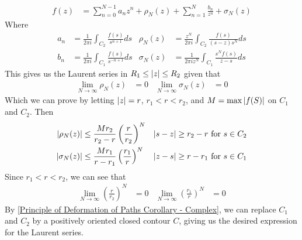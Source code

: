 \documentclass[12pt, english]{book}
\makeatletter
\renewenvironment{proof}[1][\proofname]{\par
	\pushQED{\qed}%
	\normalfont \topsep6\p@\@plus6\p@\relax
	\list{}{%
		\settowidth{\leftmargin}{\itshape\proofname:\hskip\labelsep}%
		\setlength{\labelwidth}{0pt}%
		\setlength{\itemindent}{-\leftmargin}%
		}%
	\item[\hskip\labelsep\itshape#1\@addpunct{:}]\ignorespaces
	}{\popQED\endlist\@endpefalse}
\makeatother
\begin{document}
\begin{proof}
\begin{align*}
 			f(z) &= \sum_{n=0}^{N-1} a_n z^n + \rho_N (z) + \sum_{n=1}^{N} \frac{b_n}{z^n} + \sigma_N (z) 
 		\end{align*}
 		Where
 		\begin{align*}
 			a_n &= \frac{1}{2\pi i} \int_{C_2} \frac{f(s)}{s^{n+1}} ds &
 				\rho_N (z) &= \frac{z^N}{2\pi i} \int_{C_2} \frac{f(s)}{(s-z)s^N} ds \\
 			b_n &= \frac{1}{2\pi i} \int_{C_1} \frac{f(s)}{s^{-n+1}} ds &
 				\sigma_N (z) &= \frac{1}{2\pi i z^N} \int_{C_1} \frac{s^N f(s)}{z-s} ds
 		\end{align*}
 		This gives us the Laurent series in \(R_1 \leq \abs{z} \leq R_2\) given that 
 		\begin{align*}
 			\lim_{N\rightarrow \infty} \rho_N(z) &= 0 & 
 			\lim_{N\rightarrow \infty} \sigma_N (z) &= 0
 		\end{align*}
 		Which we can prove by letting \(\abs{z} = r\), \(r_1 < r < r_2\), and \(M = \max\abs{f(S)}\) on \(C_1\) and \(C_2\). Then
 		\begin{align*}
 			\abs{\rho_N (z)} &\leq \frac{M r_2}{r_2 - r} \left(\frac{r}{r_2}\right)^N & 
 				\abs{s-z} &\geq r_2 - r  \text{ for } s \in C_2\\
 			\abs{\sigma_N (z)} &\leq \frac{M r_1}{r-r_1} \left(\frac{r_1}{r}\right)^N &
 				\abs{z-s} &\geq r - r_1  \text{ for } s \in C_1
 		\end{align*}
 		Since \(r_1 < r < r_2\), we can see that 
 		\begin{align*}
 			\lim_{N \rightarrow \infty} \left(\frac{r}{r_2}\right)^N &= 0 & 
 			\lim_{N \rightarrow \infty} \left(\frac{r_1}{r}\right)^N &= 0
 		\end{align*}
		By \cref{Principle of Deformation of Paths Corollary - Complex}, we can replace \(C_1\) and \(C_2\) by a positively oriented closed contour \(C\), giving us the desired expression for the Laurent series.
		

\end{proof}
\end{document}
